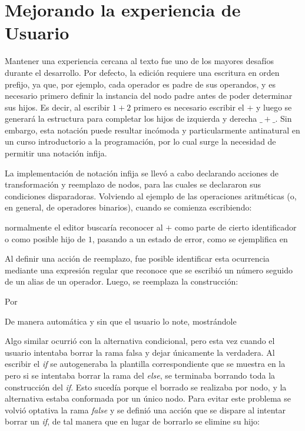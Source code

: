 \section{Mejorando la experiencia de Usuario}\label{usabilidad}

Mantener una experiencia cercana al texto fue uno de los mayores desafíos durante el desarrollo. Por defecto, la edición requiere una escritura en orden prefijo, ya que, por ejemplo, cada operador es padre de sus operandos, y es necesario primero definir la instancia del nodo padre antes de poder determinar sus hijos.
Es decir, al escribir $1+2$ primero es necesario escribir el $+$ y luego se generará la estructura para completar los hijos de izquierda y derecha $\_ + \_$. Sin embargo, esta notación puede resultar incómoda y particularmente antinatural en un curso introductorio a la programación, por lo cual surge la necesidad de permitir una notación infija.

La implementación de notación infija se llevó a cabo declarando acciones de transformación y reemplazo de nodos, para las cuales se declararon sus condiciones disparadoras. 
Volviendo al ejemplo de las operaciones aritméticas (o, en general, de operadores binarios), cuando se comienza escribiendo:

\centertree{
  [1
    [+]
  ]
}



normalmente el editor buscaría reconocer al $+$ como parte de cierto identificador o como posible hijo de $1$, pasando a un estado de error, como se ejemplifica en 


Al definir una acción de reemplazo, fue posible identificar esta ocurrencia mediante una expresión regular que reconoce que se escribió un número seguido de un alias de un operador. Luego, se reemplaza la construcción:

\centertree{
  [1
    [+]
    [empty]
  ]
}

Por 
\centertree{
  [+
    [1]
    [empty]
  ]
}

De manera automática y sin que el usuario lo note, mostrándole 


Algo similar ocurrió con la alternativa condicional, pero esta vez cuando el usuario intentaba borrar la rama falsa y dejar únicamente la verdadera.
Al escribir el \emph{if} se autogeneraba la plantilla correspondiente que se muestra en la   pero si se intentaba borrar la rama del \textit{else}, se terminaba borrando toda la construcción del \textit{if}. Esto sucedía porque el borrado se realizaba por nodo, y la alternativa estaba conformada por un único nodo. Para evitar este problema se volvió optativa la rama \textit{false} y se definió una acción que se dispare al intentar borrar un \textit{if}, de tal manera que en lugar de borrarlo se elimine su hijo:

